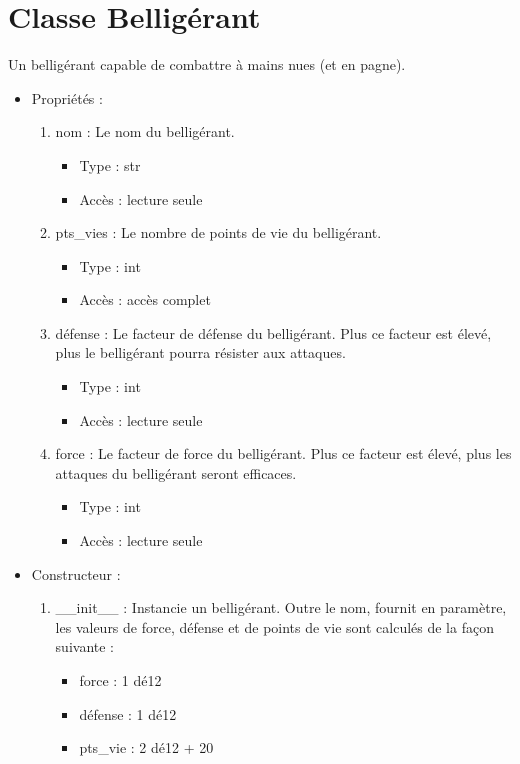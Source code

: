 \documentclass[12pt,pdftex,oneside]{article}
\begin{document}
  \section {Classe Belligérant}

  Un belligérant capable de combattre à mains nues (et en pagne).

  \begin{itemize}
  \item Propriétés : 
    \begin{enumerate}
    \item nom : Le nom du belligérant.
          \begin{itemize}
          \item Type : str
          \item Accès : lecture seule
          \end{itemize}
    \item pts\_vies : Le nombre de points de vie du belligérant.
          \begin{itemize}
          \item Type : int
          \item Accès : accès complet
          \end{itemize}
    \item défense : Le facteur de défense du belligérant. Plus ce facteur est
      élevé, plus le belligérant pourra résister aux attaques.
          \begin{itemize}
          \item Type : int
          \item Accès : lecture seule
          \end{itemize}
    \item force : Le facteur de force du belligérant. Plus ce facteur est
      élevé, plus les attaques du belligérant seront efficaces.
          \begin{itemize}
          \item Type : int
          \item Accès : lecture seule
          \end{itemize}

    \end{enumerate}

  \item Constructeur : 

    \begin{enumerate}
    \item \_\_init\_\_ : Instancie un belligérant. Outre le nom, fournit en
paramètre, les valeurs de force, défense et de points de vie sont calculés de la
façon suivante :
        \begin{itemize}
          \item force : 1 dé12
          \item défense : 1 dé12
          \item pts\_vie : 2 dé12 + 20
        \end{itemize}


\end{enumerate}
\end{itemize}
\end{document}
